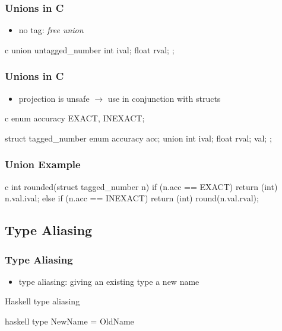 \documentclass[dvipsnames]{beamer}
\theoremstyle{plain}
\begin{document}
\begin{frame}[fragile]
  \frametitle{Unions in C}

  \begin{itemize}
    \item no tag: \emph{free union}
  \end{itemize}

  \begin{example}
    \begin{pygments}{c}
union untagged_number {
    int ival;
    float rval;
};
    \end{pygments}
  \end{example}
\end{frame}

\begin{frame}[fragile]
  \frametitle{Unions in C}

  \begin{itemize}
    \item projection is unsafe $\rightarrow$ use in conjunction with structs
  \end{itemize}

  \begin{example}
    \begin{pygments}{c}
enum accuracy {EXACT, INEXACT};

struct tagged_number {
    enum accuracy acc;
    union {
        int ival;
        float rval;
    } val;
};
    \end{pygments}
  \end{example}
\end{frame}

\begin{frame}[fragile]
  \frametitle{Union Example}

  \begin{example}
    \begin{pygments}{c}
int rounded(struct tagged_number n)
{
    if (n.acc == EXACT)
        return (int) n.val.ival;
    else if (n.acc == INEXACT)
        return (int) round(n.val.rval);
}
    \end{pygments}
  \end{example}
\end{frame}

\subsection{Type Aliasing}

\begin{frame}[fragile]
  \frametitle{Type Aliasing}

  \begin{itemize}
    \item \alert{type aliasing}: giving an existing type a new name
  \end{itemize}

  \begin{block}{Haskell type aliasing}
    \begin{pygments}{haskell}
type NewName = OldName
    \end{pygments}
  \end{block}
\end{frame}
\end{document}
